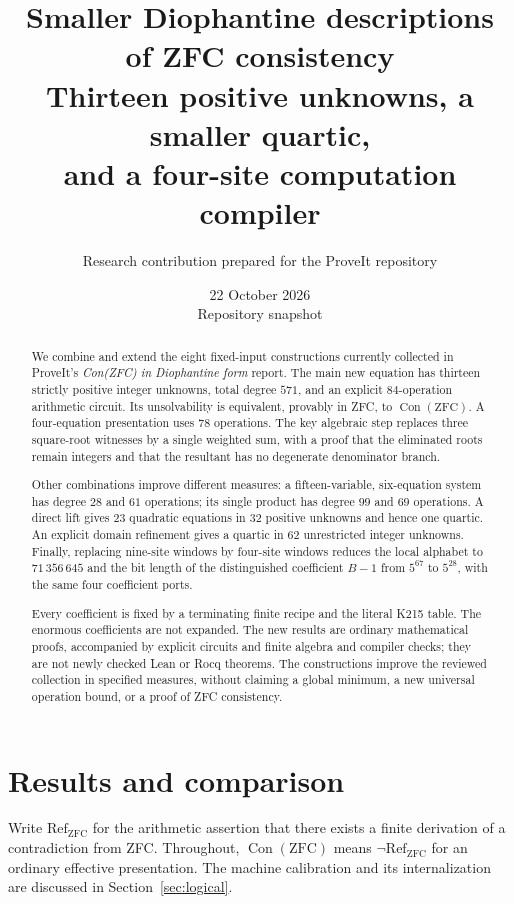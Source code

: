\documentclass[11pt,a4paper]{article}
\title{\textbf{Smaller Diophantine descriptions of ZFC consistency}\\[5pt]
\large Thirteen positive unknowns, a smaller quartic,\\
and a four-site computation compiler}
\author{Research contribution prepared for the ProveIt repository}
\date{22 October 2026\\[3pt]\small Repository snapshot \pin}
\theoremstyle{remark}\newtheorem{remark}[theorem]{Remark}
\newcommand{\Con}{\operatorname{Con}}
\begin{document}
\maketitle
\begin{abstract}
We combine and extend the eight fixed-input constructions currently collected
in ProveIt's \emph{Con(ZFC) in Diophantine form} report. The main new equation
has thirteen strictly positive integer unknowns, total degree $571$, and an
explicit $84$-operation arithmetic circuit. Its unsolvability is equivalent,
provably in ZFC, to $\Con(\mathrm{ZFC})$. A four-equation presentation uses
$78$ operations. The key algebraic step replaces three square-root witnesses
by a single weighted sum, with a proof that the eliminated roots remain
integers and that the resultant has no degenerate denominator branch.

Other combinations improve different measures: a fifteen-variable,
six-equation system has degree $28$ and $61$ operations; its single
product has degree $99$ and $69$ operations. A direct lift gives $23$
quadratic equations in $32$ positive unknowns and hence one quartic. An
explicit domain refinement gives a quartic in $62$ unrestricted integer
unknowns. Finally, replacing nine-site windows by four-site windows reduces
the local alphabet to $71\,356\,645$ and the bit length of the distinguished
coefficient $B-1$ from $5^{67}$ to $5^{28}$, with the same four coefficient ports.

Every coefficient is fixed by a terminating finite recipe and the literal
K215 table. The enormous coefficients are not expanded. The new results
are ordinary mathematical proofs, accompanied by explicit circuits and
finite algebra and compiler checks; they are not newly checked Lean or
Rocq theorems. The constructions improve the reviewed collection in
specified measures, without claiming a global minimum, a new universal
operation bound, or a proof of ZFC consistency.
\end{abstract}
\clearpage
\tableofcontents
\clearpage

\section{Results and comparison}
\label{sec:results}

Write $\mathrm{Ref}_{\mathrm{ZFC}}$ for the arithmetic assertion that there
exists a finite derivation of a contradiction from ZFC. Throughout,
$\Con(\mathrm{ZFC})$ means $\neg\mathrm{Ref}_{\mathrm{ZFC}}$ for an ordinary
effective presentation. The machine calibration and its internalization
are discussed in Section~\ref{sec:logical}.
\end{document}
